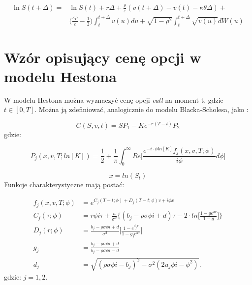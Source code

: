 \documentclass{pracamgr}
\begin{document}
\begin{equation}
\begin{aligned}
\label{eq:HestonLnSDiscretization}
\ln S(t + \Delta) = & \ln S(t) + r \Delta + \frac{\rho}{\varepsilon} (v(t + \Delta)  - v(t) - \kappa \theta \Delta) + \\
& \Big( \frac{\kappa \rho}{\varepsilon} - \frac{1}{2} \Big)
\int_t^{t+\Delta} v(u) du + \sqrt{1-\rho^2} \int_t^{t+\Delta} \sqrt{v(u)}dW(u)
\end{aligned}
\end{equation}




\section{Wzór opisujący cenę opcji w modelu Hestona}

W modelu Hestona można wyznaczyć cenę opcji \textit{call} na moment t, 
gdzie $t \in [0, T]$. Można ją zdefiniować, analogicznie do modelu Blacka-Scholesa, jako 
\cite{Heston}:

\begin{equation}
\label{eq:HestonCharacteristicFirst}
  C(S, v, t) = SP_1 -K e^{-r(T-t)} P_2
\end{equation}
gdzie:

\begin{equation}
\label{eq:HestonProb}
  P_j (x, v, T; ln[K]) = \frac{1}{2} + \frac{1}{\pi} \int_{0}^{\infty} Re \bigg[ \frac{e^{-i \cdot \phi ln[K]} f_j(x, v, T; \phi) }{i \phi} d \phi \bigg]
\end{equation}

\begin{equation}
  x = ln(S_t)
\end{equation}
Funkcje charakterystyczne mają postać: 

\begin{equation}
\label{eq:HestonCharacteristic}
  \begin{aligned}
f_j(x, v, T; \phi) &= e^{C_j(T-t; \phi) + D_j(T-t; \phi)v + i \phi x} \\
C_j (\tau; \phi)     &= r \phi i \tau + \frac{a}{\sigma^2} \bigg\{ (b_j - \rho \sigma \phi i + d) \tau - 2 \cdot ln \bigg[ \frac{1 - ge^{dr}}{1-g} \bigg] \bigg\} \\
D_j (r; \phi)        &= \frac{b_j- \rho \sigma \phi i + d}{\sigma^2} \bigg[ \frac{1 - e^{d_j \tau}}{1 - g_je^{d\tau}} \bigg]   \\
g_j                &= \frac{b_j - \rho \sigma \phi i + d}{b_j - \rho \sigma \phi i - d} \\
d_j                &= \sqrt{(\rho \sigma \phi i  - b_j)^2 - \sigma^2(2 u_j \phi  i  - \phi^2)}.
  \end{aligned}
\end{equation}
gdzie: $j = 1,2$.
\end{document}
